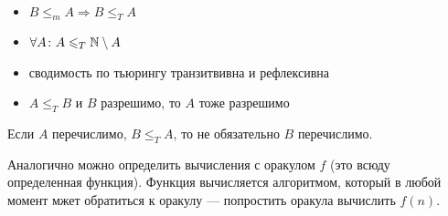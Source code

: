 \begin{prop}
	~\begin{itemize}
		\item $ B \le _{m} A \Longrightarrow B \le _T A$
		\item $ \forall A\colon  A \leqslant _{T} \mathbb{N} \setminus A $
		\item сводимость по тьюрингу транзитвивна и рефлексивна
		\item $ A \le _{T} B $ и $ B$ разрешимо, то $ A$ тоже разрешимо
    \end{itemize}
\end{prop}
\begin{note}
	Если $ A$ перечислимо, $ B \le _{T} A$, то не обязательно $ B$ перечислимо. 
\end{note}


\begin{defn}
	Аналогично можно определить вычисления с оракулом $ f$ (это всюду определенная функция).
	Функция вычисляется алгоритмом, который в любой момент мжет обратиться к оракулу ---  попростить оракула вычислить $ f(n)$.
\end{defn}
